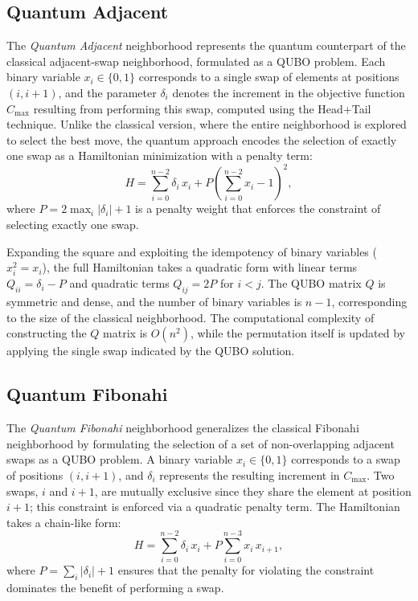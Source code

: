 \documentclass[10pt,twoside,twocolumn,a4paper]{article}
\begin{document}
\subsection{Quantum Adjacent}
The \emph{Quantum Adjacent} neighborhood represents the quantum counterpart of the classical adjacent-swap neighborhood, formulated as a QUBO problem. Each binary variable $x_i \in \{0,1\}$ corresponds to a single swap of elements at positions $(i, i+1)$, and the parameter $\delta_i$ denotes the increment in the objective function $C_{\max}$ resulting from performing this swap, computed using the Head+Tail technique. Unlike the classical version, where the entire neighborhood is explored to select the best move, the quantum approach encodes the selection of exactly one swap as a Hamiltonian minimization with a penalty term:
\begin{equation}
    H = \sum_{i=0}^{n-2} \delta_i\, x_i
        + P \!\left(\sum_{i=0}^{n-2} x_i - 1\right)^{\!2},
    \label{eq:qubo_adj}
\end{equation}
where $P = 2\max_i|\delta_i|+1$ is a penalty weight that enforces the constraint of selecting exactly one swap.

Expanding the square and exploiting the idempotency of binary variables ($x_i^2 = x_i$), the full Hamiltonian takes a quadratic form with linear terms $Q_{ii} = \delta_i - P$ and quadratic terms $Q_{ij} = 2P$ for $i < j$. The QUBO matrix $Q$ is symmetric and dense, and the number of binary variables is $n-1$, corresponding to the size of the classical neighborhood. The computational complexity of constructing the $Q$ matrix is $O(n^2)$, while the permutation itself is updated by applying the single swap indicated by the QUBO solution.


\subsection{Quantum Fibonahi}
The \emph{Quantum Fibonahi} neighborhood generalizes the classical Fibonahi neighborhood by formulating the selection of a set of non-overlapping adjacent swaps as a QUBO problem. A binary variable $x_i \in \{0,1\}$ corresponds to a swap of positions $(i, i+1)$, and $\delta_i$ represents the resulting increment in $C_{\max}$. Two swaps, $i$ and $i+1$, are mutually exclusive since they share the element at position $i+1$; this constraint is enforced via a quadratic penalty term. The Hamiltonian takes a chain-like form:
\begin{equation}
    H = \sum_{i=0}^{n-2} \delta_i\, x_i
        + P \sum_{i=0}^{n-3} x_i\, x_{i+1},
    \label{eq:qubo_fib}
\end{equation}
where $P = \sum_i |\delta_i| + 1$ ensures that the penalty for violating the constraint dominates the benefit of performing a swap.
\end{document}
